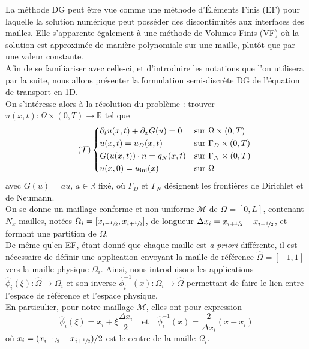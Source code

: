 \documentclass[11pt, a4paper, oneside]{report}
\begin{document}
La méthode DG peut être vue comme une méthode d'Éléments Finis (EF) pour laquelle la solution numérique peut posséder des discontinuités aux interfaces des mailles. Elle s'apparente également à une méthode de Volumes Finis (VF) où la solution est approximée de manière polynomiale sur une maille, plutôt que par une valeur constante. \\
Afin de se familiariser avec celle-ci, et d'introduire les notations que l'on utilisera par la suite, nous allons présenter la formulation semi-discrète DG de l'équation de transport en 1D. \\
On s'intéresse alors à la résolution du problème : trouver $u(x, t) : \Omega \times (0, T) \longrightarrow \mathbb{R}$ tel que
\begin{equation} \tag{$\mathcal{T}$} \label{eq:Transport_forte}
    \left \{
    \begin{aligned}
        &\partial_t u(x, t) + \partial_x G(u) = 0   &&\text{sur } \Omega \times (0, T) \\
        &u(x, t) = u_D(x, t)                        &&\text{sur } \Gamma_D \times (0, T) \\
        &G(u(x,t)) \cdot n = q_N(x, t)              &&\text{sur } \Gamma_N \times (0, T) \\
        &u(x, 0) = u_\text{ini}(x)                  &&\text{sur } \Omega
    \end{aligned}
    \right .
\end{equation}
avec $G(u) = au$, $a \in \mathbb{R}$ fixé, où $\Gamma_D$ et $\Gamma_N$ désignent les frontières de Dirichlet et de Neumann. \\

On se donne un maillage conforme et non uniforme $\mathcal{M}$ de $\Omega = [0, L]$, contenant $N_x$ mailles, notées $\Omega_i = [x_{i - \sfrac{1}{2}}, x_{i + \sfrac{1}{2}}]$, de longueur $\Delta x_i = x_{i + \sfrac{1}{2}} - x_{i - \sfrac{1}{2}}$, et formant une partition de $\Omega$. \\
De même qu'en EF, étant donné que chaque maille est \textit{a priori} différente, il est nécessaire de définir une application envoyant la maille de référence $\widehat{\Omega} = [-1, 1]$ vers la maille physique $\Omega_i$. Ainsi, nous introduisons les applications $\widehat{\phi}_i(\xi) : \widehat{\Omega} \longrightarrow \Omega_i$ et son inverse $\widehat{\phi}_i^{-1}(x) : \Omega_i \longrightarrow \widehat{\Omega}$ permettant de faire le lien entre l'espace de référence et l'espace physique. \\
En particulier, pour notre maillage $\mathcal{M}$, elles ont pour expression
\begin{equation}
    \widehat{\phi}_i (\xi) = x_i + \xi \frac{\Delta x_i}{2} \quad \text{et} \quad \widehat{\phi}_i^{-1}(x) = \frac{2}{\Delta x_i} (x - x_i)
\end{equation}
où $x_i = (x_{i - \sfrac{1}{2}} + x_{i + \sfrac{1}{2}})/2$ est le centre de la maille $\Omega_i$. \\
\end{document}
